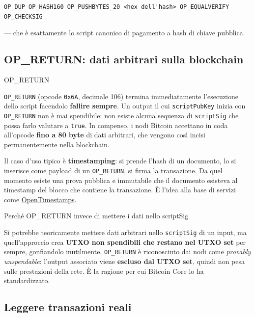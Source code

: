 \documentclass[
  italian,
  openany]{book}
\begin{document}
\begin{verbatim}
OP_DUP OP_HASH160 OP_PUSHBYTES_20 <hex dell'hash> OP_EQUALVERIFY OP_CHECKSIG
\end{verbatim}

--- che è esattamente lo script canonico di pagamento a hash di chiave
pubblica.

\subsection{OP\_RETURN: dati arbitrari sulla
blockchain}\label{op_return-dati-arbitrari-sulla-blockchain}

\begin{calloutdefinition}{OP\_RETURN}

\texttt{OP\_RETURN} (opcode \texttt{0x6A}, decimale 106) termina
immediatamente l'esecuzione dello script facendolo \textbf{fallire
sempre}. Un output il cui \texttt{scriptPubKey} inizia con
\texttt{OP\_RETURN} non è mai spendibile: non esiste alcuna sequenza di
\texttt{scriptSig} che possa farlo valutare a \texttt{true}. In
compenso, i nodi Bitcoin accettano in coda all'opcode \textbf{fino a 80
byte} di dati arbitrari, che vengono così incisi permanentemente nella
blockchain.

\end{calloutdefinition}

Il caso d'uso tipico è \textbf{timestamping}: si prende l'hash di un
documento, lo si inserisce come payload di un \texttt{OP\_RETURN}, si
firma la transazione. Da quel momento esiste una prova pubblica e
immutabile che il documento esisteva al timestamp del blocco che
contiene la transazione. È l'idea alla base di servizi come
\href{https://opentimestamps.org/}{OpenTimestamps}.

\begin{callouttip}{Perché OP\_RETURN invece di mettere i dati nello scriptSig}

Si potrebbe teoricamente mettere dati arbitrari nello \texttt{scriptSig}
di un input, ma quell'approccio crea \textbf{UTXO non spendibili che
restano nel UTXO set} per sempre, gonfiandolo inutilmente.
\texttt{OP\_RETURN} è riconosciuto dai nodi come \emph{provably
unspendable}: l'output associato viene \textbf{escluso dal UTXO set},
quindi non pesa sulle prestazioni della rete. È la ragione per cui
Bitcoin Core lo ha standardizzato.

\end{callouttip}

\subsection{Leggere transazioni reali}\label{leggere-transazioni-reali}
\end{document}
